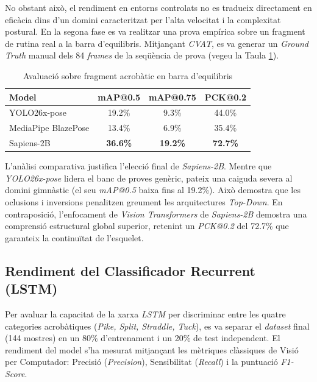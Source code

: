 \documentclass[10pt,a4paper,twocolumn,twoside]{article}
\begin{document}
No obstant això, el rendiment en entorns controlats no es tradueix directament en eficàcia dins d'un domini caracteritzat per l'alta velocitat i la complexitat postural. En la segona fase es va realitzar una prova empírica sobre un fragment de rutina real a la barra d'equilibris. Mitjançant \textit{CVAT}\cite{cvat}, es va generar un \textit{Ground Truth} manual dels 84 \textit{frames} de la seqüència de prova (vegeu la Taula \ref{tab:avaluacio-gym}).

\begin{table}[H]
\centering
\caption{Avaluació sobre fragment acrobàtic en barra d'equilibris}
\label{tab:avaluacio-gym}
\renewcommand{\arraystretch}{1.2}
\setlength{\tabcolsep}{2pt}
\begin{tabular}{lccc}
\hline
\textbf{Model} & \textbf{mAP@0.5} & \textbf{mAP@0.75} & \textbf{PCK@0.2} \\ \hline
YOLO26x-pose & 19.2\% & 9.3\% & 44.0\% \\
MediaPipe BlazePose & 13.4\% & 6.9\% & 35.4\% \\
Sapiens-2B & \textbf{36.6\%} & \textbf{19.2\%} & \textbf{72.7\%} \\ \hline
\end{tabular}
\end{table}

L'anàlisi comparativa justifica l'elecció final de \textit{Sapiens-2B}. Mentre que \textit{YOLO26x-pose} lidera el banc de proves genèric, pateix una caiguda severa al domini gimnàstic (el seu \textit{mAP@0.5} baixa fins al 19.2\%). Això demostra que les oclusions i inversions penalitzen greument les arquitectures \textit{Top-Down}. En contraposició, l'enfocament de \textit{Vision Transformers} de \textit{Sapiens-2B} demostra una comprensió estructural global superior, retenint un \textit{PCK@0.2} del 72.7\% que garanteix la continuïtat de l'esquelet.

\subsection{Rendiment del Classificador Recurrent (LSTM)}
Per avaluar la capacitat de la xarxa \textit{LSTM} per discriminar entre les quatre categories acrobàtiques (\textit{Pike, Split, Straddle, Tuck}), es va separar el \textit{dataset} final (144 mostres) en un 80\% d'entrenament i un 20\% de test independent. El rendiment del model s'ha mesurat mitjançant les mètriques clàssiques de Visió per Computador: Precisió (\textit{Precision}), Sensibilitat (\textit{Recall}) i la puntuació \textit{F1-Score}.
\end{document}

